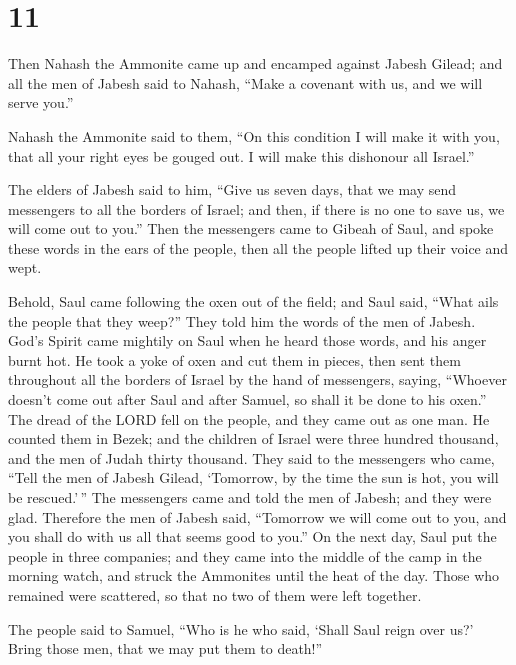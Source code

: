 \hypertarget{section-10}{%
\section{11}\label{section-10}}

 Then Nahash the Ammonite came up and encamped against
Jabesh Gilead; and all the men of Jabesh said to Nahash, ``Make a
covenant with us, and we will serve you.''

 Nahash the Ammonite said to them, ``On this condition I
will make it with you, that all your right eyes be gouged out. I will
make this dishonour all Israel.''

 The elders of Jabesh said to him, ``Give us seven days,
that we may send messengers to all the borders of Israel; and then, if
there is no one to save us, we will come out to you.'' 
Then the messengers came to Gibeah of Saul, and spoke these words in the
ears of the people, then all the people lifted up their voice and wept.

 Behold, Saul came following the oxen out of the field;
and Saul said, ``What ails the people that they weep?'' They told him
the words of the men of Jabesh.  God's Spirit came
mightily on Saul when he heard those words, and his anger burnt hot.
 He took a yoke of oxen and cut them in pieces, then sent
them throughout all the borders of Israel by the hand of messengers,
saying, ``Whoever doesn't come out after Saul and after Samuel, so shall
it be done to his oxen.'' The dread of the LORD fell on the people, and
they came out as one man.  He counted them in Bezek; and
the children of Israel were three hundred thousand, and the men of Judah
thirty thousand.  They said to the messengers who came,
``Tell the men of Jabesh Gilead, `Tomorrow, by the time the sun is hot,
you will be rescued.'\,'' The messengers came and told the men of
Jabesh; and they were glad.  Therefore the men of Jabesh
said, ``Tomorrow we will come out to you, and you shall do with us all
that seems good to you.''  On the next day, Saul put the
people in three companies; and they came into the middle of the camp in
the morning watch, and struck the Ammonites until the heat of the day.
Those who remained were scattered, so that no two of them were left
together.

 The people said to Samuel, ``Who is he who said, `Shall
Saul reign over us?' Bring those men, that we may put them to death!''

